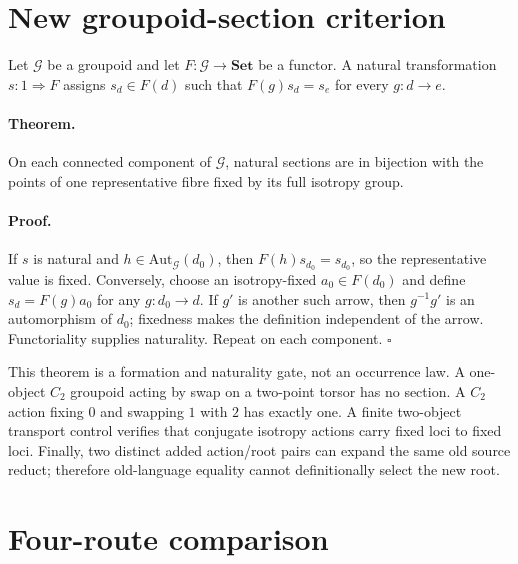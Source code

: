 \documentclass[11pt]{article}
\begin{document}
\section{New groupoid-section criterion}

Let $\mathcal G$ be a groupoid and let $F:\mathcal G\to\mathbf{Set}$ be a
functor.  A natural transformation $s:1\Rightarrow F$ assigns
$s_d\in F(d)$ such that $F(g)s_d=s_e$ for every $g:d\to e$.

\paragraph{Theorem.}
On each connected component of $\mathcal G$, natural sections are in bijection
with the points of one representative fibre fixed by its full isotropy group.

\paragraph{Proof.}
If $s$ is natural and $h\in\mathrm{Aut}_{\mathcal G}(d_0)$, then
$F(h)s_{d_0}=s_{d_0}$, so the representative value is fixed.  Conversely,
choose an isotropy-fixed $a_0\in F(d_0)$ and define
$s_d=F(g)a_0$ for any $g:d_0\to d$.  If $g'$ is another such arrow, then
$g^{-1}g'$ is an automorphism of $d_0$; fixedness makes the definition
independent of the arrow.  Functoriality supplies naturality.  Repeat on each
component. \hfill$\square$

This theorem is a formation and naturality gate, not an occurrence law.  A
one-object $C_2$ groupoid acting by swap on a two-point torsor has no section.
A $C_2$ action fixing $0$ and swapping $1$ with $2$ has exactly one.  A finite
two-object transport control verifies that conjugate isotropy actions carry
fixed loci to fixed loci.  Finally, two distinct added action/root pairs can
expand the same old source reduct; therefore old-language equality cannot
definitionally select the new root.

\section{Four-route comparison}
\end{document}
